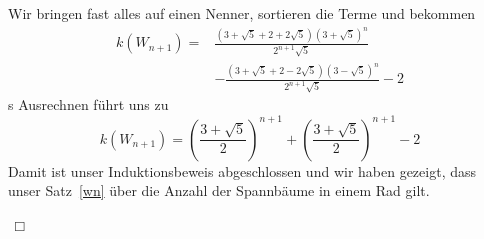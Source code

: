 Wir bringen fast alles auf einen Nenner, sortieren die Terme und bekommen
\begin{equation}
\begin{aligned}
\mathit{k}\left(W_{n+1}\right) = {}  & \frac{\left(3+\sqrt{5}+2+2\sqrt{5}\right)\left(3+\sqrt{5}\right)^{n}}{2^{n+1}\sqrt{5}} \\%
                        & -\frac{\left(3+\sqrt{5}+2-2\sqrt{5}\right)\left(3-\sqrt{5}\right)^{n}}{2^{n+1}\sqrt{5}}-2 
\end{aligned}
\end{equation}s
Ausrechnen führt uns zu\\
\begin{equation}
\mathit{k}\left(W_{n+1}\right) = \left(\frac{3+\sqrt{5}}{2}\right)^{n+1}+\left(\frac{3+\sqrt{5}}{2}\right)^{n+1}-2
\end{equation}
Damit ist unser Induktionsbeweis abgeschlossen und wir haben gezeigt, dass unser Satz~\ref{wn} über die Anzahl der Spannbäume in einem Rad gilt.
\begin{flushright} $\,\Box\,$ \end{flushright} 
